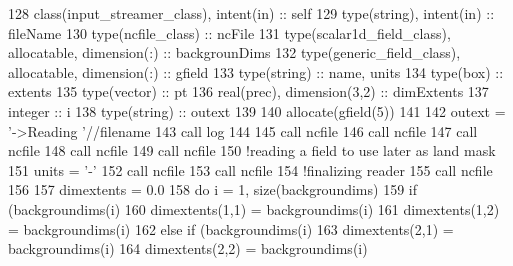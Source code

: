 \begin{DoxyCode}
128     \textcolor{keywordtype}{class}(input\_streamer\_class), \textcolor{keywordtype}{intent(in)} :: self
129     \textcolor{keywordtype}{type}(string), \textcolor{keywordtype}{intent(in)} :: fileName
130     \textcolor{keywordtype}{type}(ncfile\_class) :: ncFile
131     \textcolor{keywordtype}{type}(scalar1d\_field\_class), \textcolor{keywordtype}{allocatable}, \textcolor{keywordtype}{dimension(:)} :: backgrounDims
132     \textcolor{keywordtype}{type}(generic\_field\_class), \textcolor{keywordtype}{allocatable}, \textcolor{keywordtype}{dimension(:)} :: gfield
133     \textcolor{keywordtype}{type}(string) :: name, units
134     \textcolor{keywordtype}{type}(box) :: extents
135     \textcolor{keywordtype}{type}(vector) :: pt
136     \textcolor{keywordtype}{real(prec)}, \textcolor{keywordtype}{dimension(3,2)} :: dimExtents
137     \textcolor{keywordtype}{integer} :: i
138     \textcolor{keywordtype}{type}(string) :: outext
139 
140     \textcolor{keyword}{allocate}(gfield(5))
141 
142     outext = \textcolor{stringliteral}{'->Reading '}//filename
143     \textcolor{keyword}{call }log%
144 
145     \textcolor{keyword}{call }ncfile%
146     \textcolor{keyword}{call }ncfile%
147     \textcolor{keyword}{call }ncfile%
148     \textcolor{keyword}{call }ncfile%
149     \textcolor{keyword}{call }ncfile%
150     \textcolor{comment}{!reading a field to use later as land mask}
151     units = \textcolor{stringliteral}{'-'}
152     \textcolor{keyword}{call }ncfile%
153     \textcolor{keyword}{call }ncfile%
154     \textcolor{comment}{!finalizing reader}
155     \textcolor{keyword}{call }ncfile%
156 
157     dimextents = 0.0
158     \textcolor{keywordflow}{do} i = 1, \textcolor{keyword}{size}(backgroundims)
159         \textcolor{keywordflow}{if} (backgroundims(i)%
160             dimextents(1,1) = backgroundims(i)%
161             dimextents(1,2) = backgroundims(i)%
162         \textcolor{keywordflow}{else} \textcolor{keywordflow}{if} (backgroundims(i)%
163             dimextents(2,1) = backgroundims(i)%
164             dimextents(2,2) = backgroundims(i)%

\end{DoxyCode}
